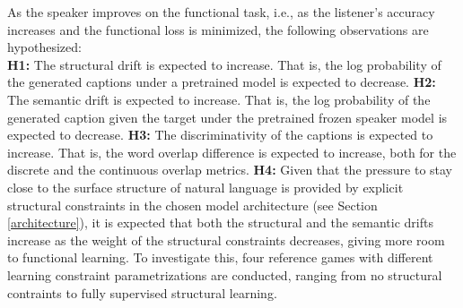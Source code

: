 As the speaker improves on the functional task, i.e., as the listener's accuracy increases and the functional loss is minimized, the following observations are hypothesized: \\
\newline 
\textbf{H1:} The structural drift is expected to increase. That is, the log probability of the generated captions under a pretrained model is expected to decrease. \newline
\textbf{H2:} The semantic drift is expected to increase. That is, the log probability of the generated caption given the target under the pretrained frozen speaker model is expected to decrease. \newline
\textbf{H3:} The discriminativity of the captions is expected to increase. That is, the word overlap difference is expected to increase, both for the discrete and the continuous overlap metrics. \newline
\textbf{H4:} Given that the pressure to stay close to the surface structure of natural language is provided by explicit structural constraints in the chosen model architecture (see Section \ref{architecture}), it is expected that both the structural and the semantic drifts increase as the weight of the structural constraints decreases, giving more room to functional learning. To investigate this, four reference games with different learning constraint parametrizations are conducted, ranging from no structural contraints to fully supervised structural learning. \newline
